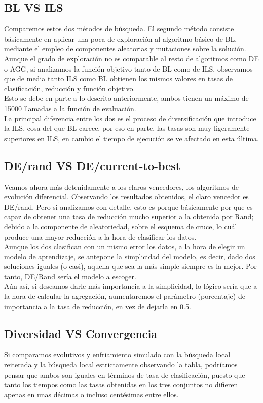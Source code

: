 \subsection{BL VS ILS}
Comparemos estos dos métodos de búsqueda. El segundo método consiste básicamente en aplicar una poca de exploración al algoritmo básico de BL, mediante el empleo de componentes aleatorias y mutaciones sobre la solución. Aunque el grado de exploración no es comparable al resto de algoritmos como DE o AGG, si analizamos la función objetivo tanto de BL como de ILS, observamos que de media tanto ILS como BL obtienen los mismos valores en tasas de clasificación, reducción y función objetivo. \\ 
Esto se debe en parte a lo descrito anteriormente, ambos tienen un máximo de 15000 llamadas a la función de evaluación.\\ 
La principal diferencia entre los dos es el proceso de diversificación que introduce la ILS, cosa del que BL carece, por eso en parte, las tasas son muy ligeramente superiores en ILS, en cambio el tiempo de ejecución se ve afectado en esta última.


\subsection{DE/rand VS DE/current-to-best}
Veamos ahora más detenidamente a los claros vencedores, los algoritmos de evolución diferencial.
Observando los resultados obtenidos, el claro vencedor es DE/rand. Pero si analizamos con detalle, esto es porque básicamente por que es capaz de obtener una tasa de reducción mucho superior a la obtenida por Rand; debido a la componente de aleatoriedad, sobre el esquema de cruce, lo cuál produce una mayor reducción a la hora de clasificar los datos.\\ 

Aunque los dos clasifican con un mismo error los datos, a la hora de elegir un modelo de aprendizaje, se antepone la simplicidad del modelo, es decir, dado dos soluciones iguales (o casi), aquella que sea la más simple siempre es la mejor. Por tanto, DE/Rand sería el modelo a escoger.\\ 

Aún así, si deseamos darle más importancia a la simplicidad, lo lógico sería que a la hora de calcular la agregación, aumentaremos el parámetro (porcentaje) de importancia a la tasa de reducción, en vez de dejarla en 0.5.


\subsection{Diversidad VS Convergencia}
Si comparamos evolutivos y enfriamiento simulado con la búsqueda local reiterada y la búsqueda local estrictamente observando la tabla, podríamos pensar que ambos son iguales en términos de tasa de clasificación, puesto que tanto los tiempos como las tasas obtenidas en los tres conjuntos no difieren apenas en unas décimas o incluso centésimas entre ellos.\\ 

